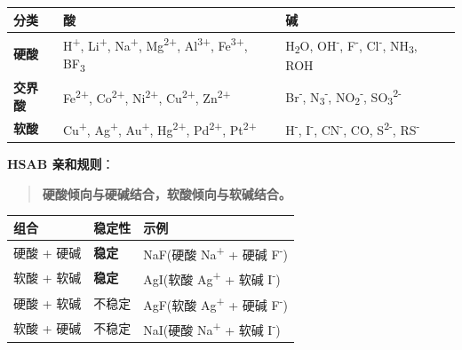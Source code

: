 \documentclass[a4paper,11pt]{ctexart}
\newcounter{none}
\newcommand{\箭}{\ensuremath{\rightarrow}}
\newcommand{\左箭}{\ensuremath{\leftarrow}}
\newcommand{\上箭}{\ensuremath{\uparrow}}
\newcommand{\下箭}{\ensuremath{\downarrow}}
\newcommand{\衡}{\ensuremath{\rightleftharpoons}}
\newcommand{\双箭}{\ensuremath{\leftrightarrow}}
\newcommand{\约等于}{\ensuremath{\approx}}
\newcommand{\小于等于}{\ensuremath{\leq}}
\newcommand{\大于等于}{\ensuremath{\geq}}
\newcommand{\不等于}{\ensuremath{\neq}}
\newcommand{\西格马}{\ensuremath{\sigma}}
\newcommand{\派}{\ensuremath{\pi}}
\begin{document}
{\def\LTcaptype{none} %
\begin{longtable}[]{@{}
  >{\raggedright\arraybackslash}p{}
  >{\raggedright\arraybackslash}p{}
  >{\raggedright\arraybackslash}p{}@{}}
\toprule\noalign{}
\begin{minipage}[b]{\linewidth}\raggedright
分类
\end{minipage} & \begin{minipage}[b]{\linewidth}\raggedright
酸
\end{minipage} & \begin{minipage}[b]{\linewidth}\raggedright
碱
\end{minipage} \\
\midrule\noalign{}
\endhead
\bottomrule\noalign{}
\endlastfoot
\textbf{硬酸} & H\textsuperscript{+}, Li\textsuperscript{+}, Na\textsuperscript{+}, Mg\textsuperscript{2+}, Al\textsuperscript{3+}, Fe\textsuperscript{3+}, BF\textsubscript{3} & H\textsubscript{2}O, OH\textsuperscript{-}, F\textsuperscript{-}, Cl\textsuperscript{-}, NH\textsubscript{3}, ROH \\
\textbf{交界酸} & Fe\textsuperscript{2+}, Co\textsuperscript{2+}, Ni\textsuperscript{2+}, Cu\textsuperscript{2+}, Zn\textsuperscript{2+} & Br\textsuperscript{-}, N\textsubscript{3}\textsuperscript{-}, NO\textsubscript{2}\textsuperscript{-}, SO\textsubscript{3}\textsuperscript{2-} \\
\textbf{软酸} & Cu\textsuperscript{+}, Ag\textsuperscript{+}, Au\textsuperscript{+}, Hg\textsuperscript{2+}, Pd\textsuperscript{2+}, Pt\textsuperscript{2+} & H\textsuperscript{-}, I\textsuperscript{-}, CN\textsuperscript{-}, CO, S\textsuperscript{2-}, RS\textsuperscript{-} \\
\end{longtable}
}

\textbf{HSAB 亲和规则}：

\begin{quote}
\textbf{硬酸倾向与硬碱结合，软酸倾向与软碱结合。}
\end{quote}

{\def\LTcaptype{none} %
\begin{longtable}[]{@{}lll@{}}
\toprule\noalign{}
组合 & 稳定性 & 示例 \\
\midrule\noalign{}
\endhead
\bottomrule\noalign{}
\endlastfoot
硬酸 + 硬碱 & \textbf{稳定} & NaF(硬酸 Na\textsuperscript{+} + 硬碱 F\textsuperscript{-}) \\
软酸 + 软碱 & \textbf{稳定} & AgI(软酸 Ag\textsuperscript{+} + 软碱 I\textsuperscript{-}) \\
硬酸 + 软碱 & 不稳定 & AgF(软酸 Ag\textsuperscript{+} + 硬碱 F\textsuperscript{-}) \\
软酸 + 硬碱 & 不稳定 & NaI(硬酸 Na\textsuperscript{+} + 软碱 I\textsuperscript{-}) \\
\end{longtable}
}
\end{document}
